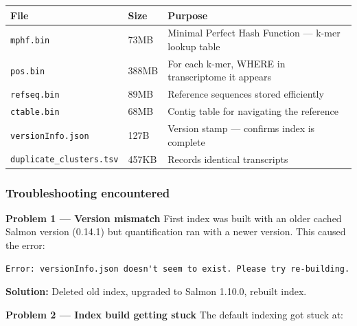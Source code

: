 \documentclass[
]{article}
\begin{document}
\begin{longtable}[]{@{}
  >{\raggedright\arraybackslash}p{}
  >{\raggedright\arraybackslash}p{}
  >{\raggedright\arraybackslash}p{}@{}}
\toprule\noalign{}
\begin{minipage}[b]{\linewidth}\raggedright
File
\end{minipage} & \begin{minipage}[b]{\linewidth}\raggedright
Size
\end{minipage} & \begin{minipage}[b]{\linewidth}\raggedright
Purpose
\end{minipage} \\
\midrule\noalign{}
\endhead
\bottomrule\noalign{}
\endlastfoot
\texttt{mphf.bin} & 73MB & Minimal Perfect Hash Function --- k-mer
lookup table \\
\texttt{pos.bin} & 388MB & For each k-mer, WHERE in transcriptome it
appears \\
\texttt{refseq.bin} & 89MB & Reference sequences stored efficiently \\
\texttt{ctable.bin} & 68MB & Contig table for navigating the
reference \\
\texttt{versionInfo.json} & 127B & Version stamp --- confirms index is
complete \\
\texttt{duplicate\_clusters.tsv} & 457KB & Records identical
transcripts \\
\end{longtable}

\subsubsection{Troubleshooting
encountered}\label{troubleshooting-encountered-1}

\textbf{Problem 1 --- Version mismatch} First index was built with an
older cached Salmon version (0.14.1) but quantification ran with a newer
version. This caused the error:

\begin{verbatim}
Error: versionInfo.json doesn't seem to exist. Please try re-building.
\end{verbatim}

\textbf{Solution:} Deleted old index, upgraded to Salmon 1.10.0, rebuilt
index.

\textbf{Problem 2 --- Index build getting stuck} The default indexing
got stuck at:
\end{document}
